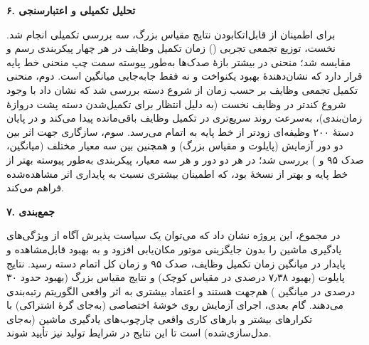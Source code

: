 \documentclass[a4paper,12pt]{article}
\begin{document}
	\vspace{0.2cm}
	
	{\large\textbf{۶. تحلیل تکمیلی و اعتبارسنجی}}
	
	برای اطمینان از قابل‌اتکابودن نتایج مقیاس بزرگ، سه بررسی تکمیلی انجام شد. نخست، توزیع تجمعی تجربی () زمان تکمیل وظایف در هر چهار پیکربندی رسم و مقایسه شد؛ منحنی  در بیشتر بازهٔ صدک‌ها به‌طور پیوسته سمت چپ منحنی خط پایه قرار دارد که نشان‌دهندهٔ بهبود یکنواخت و نه فقط جابه‌جایی میانگین است. دوم، منحنی تکمیل تجمعی وظایف بر حسب زمان از شروع دسته بررسی شد که نشان داد  با وجود شروع کندتر در وظایف نخست (به دلیل انتظار برای تکمیل‌شدن دسته پشت دروازهٔ زمان‌بندی)، به‌سرعت روند سریع‌تری در تکمیل وظایف باقی‌مانده پیدا می‌کند و در پایان دستهٔ ۲۰۰ وظیفه‌ای زودتر از خط پایه به اتمام می‌رسد. سوم، سازگاری جهت اثر بین دو دور آزمایش (پایلوت و مقیاس بزرگ) و همچنین بین سه معیار مختلف (میانگین، صدک ۹۵ و ) بررسی شد؛ در هر دو دور و هر سه معیار، پیکربندی  به‌طور پیوسته بهتر از خط پایه و بهتر از نسخهٔ  بود، که اطمینان بیشتری نسبت به پایداری اثر مشاهده‌شده فراهم می‌کند.
	
	\vspace{0.2cm}
	
	{\large\textbf{۷.  جمع‌بندی}}
	
	در مجموع، این پروژه نشان داد که می‌توان یک سیاست پذیرش آگاه از ویژگی‌های یادگیری ماشین را بدون جایگزینی موتور مکان‌یابی  افزود و به بهبود قابل‌مشاهده و پایدار در میانگین زمان تکمیل وظایف، صدک ۹۵ و زمان کل اتمام دسته رسید. نتایج پایلوت (بهبود ۷٫۳۸ درصدی در مقیاس کوچک) و نتایج مقیاس بزرگ (بهبود حدود ۳۰ درصدی در میانگین ) هم‌جهت هستند و اعتماد بیشتری به اثر واقعی الگوریتم رتبه‌بندی می‌دهند. گام بعدی، اجرای آزمایش روی خوشهٔ اختصاصی (به‌جای گرهٔ اشتراکی) با تکرارهای بیشتر و بارهای کاری واقعی چارچوب‌های یادگیری ماشین (به‌جای مدل‌سازی‌شده) است تا این نتایج در شرایط تولید نیز تأیید شوند.
	
\end{document}
